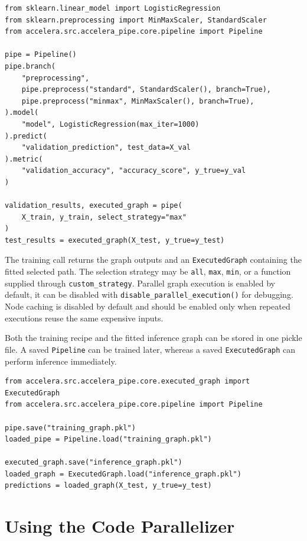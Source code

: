 \documentclass[12pt,a4paper,oneside]{report}
\renewcommand{\lstlistingname}{Algorithm}
\begin{document}
\renewcommand{\lstlistingname}{Code Example}
\begin{lstlisting}[style=paperpython,basicstyle=\ttfamily\small,caption={Training and selecting an Accelera Pipe graph},label={lst:user-pipe}]
from sklearn.linear_model import LogisticRegression
from sklearn.preprocessing import MinMaxScaler, StandardScaler
from accelera.src.accelera_pipe.core.pipeline import Pipeline

pipe = Pipeline()
pipe.branch(
    "preprocessing",
    pipe.preprocess("standard", StandardScaler(), branch=True),
    pipe.preprocess("minmax", MinMaxScaler(), branch=True),
).model(
    "model", LogisticRegression(max_iter=1000)
).predict(
    "validation_prediction", test_data=X_val
).metric(
    "validation_accuracy", "accuracy_score", y_true=y_val
)

validation_results, executed_graph = pipe(
    X_train, y_train, select_strategy="max"
)
test_results = executed_graph(X_test, y_true=y_test)
\end{lstlisting}

The training call returns the graph outputs and an \texttt{ExecutedGraph}
containing the fitted selected path. The selection strategy may be
\texttt{all}, \texttt{max}, \texttt{min}, or a function supplied through
\texttt{custom\_strategy}. Parallel graph execution is enabled by default, it
can be disabled with \texttt{disable\_parallel\_execution()} for debugging.
Node caching is disabled by default and should be enabled only when repeated
executions reuse the same expensive inputs.

Both the training recipe and the fitted inference graph can be stored in one
pickle file. A saved \texttt{Pipeline} can be trained later, whereas a saved
\texttt{ExecutedGraph} can perform inference immediately.

\begin{lstlisting}[style=paperpython,basicstyle=\ttfamily\small,caption={Saving and loading graph objects},label={lst:user-persistence}]
from accelera.src.accelera_pipe.core.executed_graph import ExecutedGraph
from accelera.src.accelera_pipe.core.pipeline import Pipeline

pipe.save("training_graph.pkl")
loaded_pipe = Pipeline.load("training_graph.pkl")

executed_graph.save("inference_graph.pkl")
loaded_graph = ExecutedGraph.load("inference_graph.pkl")
predictions = loaded_graph(X_test, y_true=y_test)
\end{lstlisting}

\section{Using the Code Parallelizer}
\end{document}
